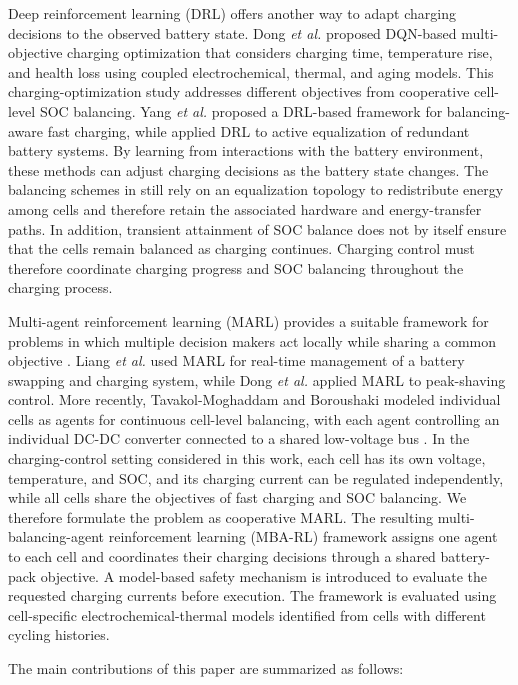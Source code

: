Deep reinforcement learning (DRL) offers another way to adapt charging decisions to the observed battery state. Dong {\it et al.} \cite{dong2025charging} proposed DQN-based multi-objective charging optimization that considers charging time, temperature rise, and health loss using coupled electrochemical, thermal, and aging models. This charging-optimization study addresses different objectives from cooperative cell-level SOC balancing. Yang {\it et al.} \cite{17} proposed a DRL-based framework for balancing-aware fast charging, while \cite{18} applied DRL to active equalization of redundant battery systems. By learning from interactions with the battery environment, these methods can adjust charging decisions as the battery state changes. The balancing schemes in \cite{17,18} still rely on an equalization topology to redistribute energy among cells and therefore retain the associated hardware and energy-transfer paths. In addition, transient attainment of SOC balance does not by itself ensure that the cells remain balanced as charging continues. Charging control must therefore coordinate charging progress and SOC balancing throughout the charging process.

Multi-agent reinforcement learning (MARL) provides a suitable framework for problems in which multiple decision makers act locally while sharing a common objective \cite{19, 20}. Liang {\it et al.} \cite{21} used MARL for real-time management of a battery swapping and charging system, while Dong {\it et al.} \cite{22} applied MARL to peak-shaving control. More recently, Tavakol-Moghaddam and Boroushaki modeled individual cells as agents for continuous cell-level balancing, with each agent controlling an individual DC-DC converter connected to a shared low-voltage bus \cite{tavakol2025marl}. In the charging-control setting considered in this work, each cell has its own voltage, temperature, and SOC, and its charging current can be regulated independently, while all cells share the objectives of fast charging and SOC balancing. We therefore formulate the problem as cooperative MARL. The resulting multi-balancing-agent reinforcement learning (MBA-RL) framework assigns one agent to each cell and coordinates their charging decisions through a shared battery-pack objective. A model-based safety mechanism is introduced to evaluate the requested charging currents before execution. The framework is evaluated using cell-specific electrochemical-thermal models identified from cells with different cycling histories.

The main contributions of this paper are summarized as follows:

